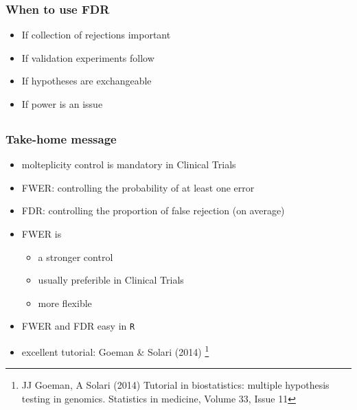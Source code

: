\documentclass[xcolor={pdftex,dvipsnames,table}]{beamer}
\newcommand{\bb}[1]{\begin{block}{#1}}
\newcommand{\eb}{\end{block}}
\newcommand{\bi}{\begin {itemize}}
\newcommand{\ei}{\end{itemize}}
\newcommand{\bfr}[1]{\begin{frame} \frametitle{#1}}
\begin{document}
\bfr{When to use FDR}
    \bi
      \item If collection of rejections important
      \item If validation experiments follow
      \item If hypotheses are exchangeable
      \item If power is an issue
    \ei
\end{frame}


\subsection{}
\bfr{Take-home message}
\bi 
\item molteplicity control is mandatory in Clinical Trials 
\item FWER: controlling the probability of at least one error
\item FDR:  controlling the  proportion of false rejection (on average)
\item FWER is 
\bi
\item a stronger control
\item usually preferible in Clinical Trials
\item more flexible
\ei
\item FWER and FDR  easy in {\tt R}
\item excellent tutorial: Goeman \& Solari (2014) \footnote{
JJ Goeman, A Solari (2014) Tutorial in biostatistics: multiple hypothesis testing in genomics. Statistics in medicine, Volume 33, Issue 11}
\ei
\end{frame}
\end{document}
